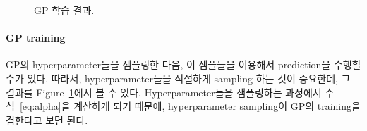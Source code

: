 \documentclass[ba]{imsart}
\begin{document}
\begin{figure}[t]
  \centering
  \caption{GP 학습 결과.}\label{fig:hyper}
\end{figure}
%
\paragraph{GP training}
GP의 hyperparameter들을 샘플링한 다음, 이 샘플들을 이용해서 prediction을 수행할 수가 있다.
따라서, hyperparameter들을 적절하게 sampling 하는 것이 중요한데, 그 결과를 Figure~\ref{fig:hyper}에서 볼 수 있다.
Hyperparameter들을 샘플링하는 과정에서 수식~\eqref{eq:alpha}을 계산하게 되기 때문에, hyperparameter sampling이 GP의 training을 겸한다고 보면 된다.
\end{document}
